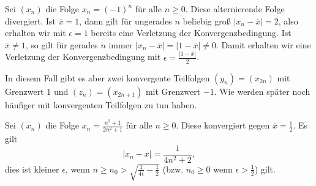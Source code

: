 \documentclass[letterpaper,10pt,english]{jupyterBook}
\begin{document}
\label{vorkurs/folgen:example-3}
\begin{example}{}{}



Sei \((x_n)\) die  Folge \(x_n = (-1)^n \) für alle \(n\geq 0\). Diese alternierende Folge divergiert. Ist \(\overline{x} = 1\), dann gilt für ungerades \(n\) beliebig groß \(\vert x_n - \overline{x}\vert = 2\), also erhalten wir mit \(\epsilon =1\) bereits eine Verletzung der Konvergenzbedingung. Ist \(\overline{x} \neq 1\), so gilt für gerades \(n\) immer \(\vert x_n - \overline{x} \vert =  \vert 1-\overline{x} \vert \neq 0\). Damit erhalten wir eine Verletzung der Konvergenzbedingung mit \(\epsilon = \frac{\vert 1-\overline{x} \vert}2\).

In diesem Fall gibt es aber zwei konvergente Teilfolgen \((y_n) = (x_{2n})\) mit Grenzwert \(1\) und \((z_n) = (x_{2n+1})\) mit Grenzwert \(-1\). Wie werden später noch häufiger mit konvergenten Teilfolgen zu tun haben.
\end{example}
\label{vorkurs/folgen:example-4}
\begin{example}{}{}



Sei \((x_n)\) die  Folge \(x_n = \frac{n^2+1}{2n^2+1} \) für alle \(n\geq 0\). Diese konvergiert  gegen \(\overline{x} = \frac{1}2\). Es gilt
\begin{equation*}
 \vert x_n - \overline{x}\vert = \frac{1}{4n^2+2},\end{equation*}
dies ist kleiner \(\epsilon\), wenn \(n \geq n_0 > \sqrt{\frac{1}{4\epsilon}-\frac{1}2}\) (bzw. \(n_0 \geq 0\) wenn \(\epsilon > \frac{1}2\)) gilt.
\end{example}
\end{document}
